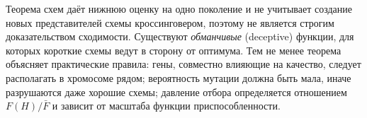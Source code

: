 Теорема схем даёт нижнюю оценку на одно поколение и не учитывает создание новых представителей схемы
кроссинговером, поэтому не является строгим доказательством сходимости. Существуют \emph{обманчивые}
(deceptive) функции, для которых короткие схемы ведут в сторону от оптимума. Тем не менее теорема
объясняет практические правила: гены, совместно влияющие на качество, следует располагать в хромосоме
рядом; вероятность мутации должна быть мала, иначе разрушаются даже хорошие схемы; давление отбора
определяется отношением $F(H)/\bar F$ и зависит от масштаба функции приспособленности.
